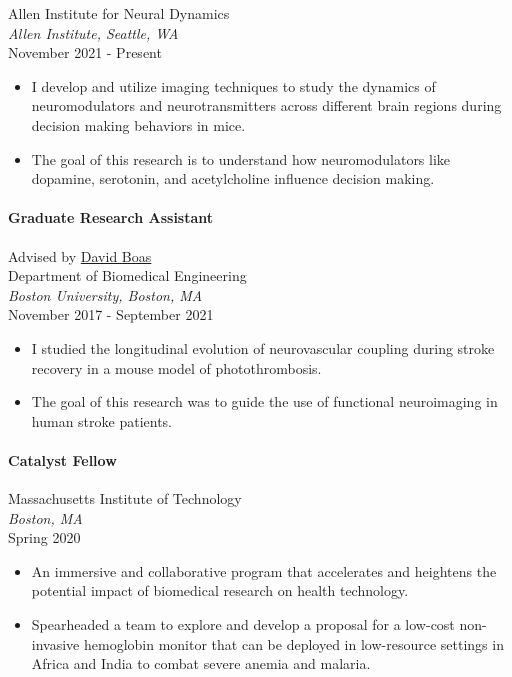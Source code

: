 \documentclass[
  letterpaper,
  DIV=11,
  numbers=noendperiod]{scrartcl}
\let\oldparagraph\paragraph
\renewcommand{\paragraph}[1]{\oldparagraph{#1}\mbox{}}
\providecommand{\tightlist}{%
  \setlength{\itemsep}{0pt}\setlength{\parskip}{0pt}}\usepackage{longtable,booktabs,array}
\begin{document}
Allen Institute for Neural Dynamics\\
\emph{Allen Institute, Seattle, WA}\\
November 2021 - Present

\begin{itemize}
\tightlist
\item
  I develop and utilize imaging techniques to study the dynamics of
  neuromodulators and neurotransmitters across different brain regions
  during decision making behaviors in mice.
\item
  The goal of this research is to understand how neuromodulators like
  dopamine, serotonin, and acetylcholine influence decision making.
\end{itemize}

\hypertarget{graduate-research-assistant}{%
\paragraph{Graduate Research
Assistant}\label{graduate-research-assistant}}

Advised by \href{https://sites.bu.edu/boas/}{David Boas}\\
Department of Biomedical Engineering\\
\emph{Boston University, Boston, MA}\\
November 2017 - September 2021

\begin{itemize}
\tightlist
\item
  I studied the longitudinal evolution of neurovascular coupling during
  stroke recovery in a mouse model of photothrombosis.
\item
  The goal of this research was to guide the use of functional
  neuroimaging in human stroke patients.
\end{itemize}

\hypertarget{catalyst-fellow}{%
\paragraph{Catalyst Fellow}\label{catalyst-fellow}}

Massachusetts Institute of Technology\\
\emph{Boston, MA}\\
Spring 2020

\begin{itemize}
\tightlist
\item
  An immersive and collaborative program that accelerates and heightens
  the potential impact of biomedical research on health technology.
\item
  Spearheaded a team to explore and develop a proposal for a low-cost
  non-invasive hemoglobin monitor that can be deployed in low-resource
  settings in Africa and India to combat severe anemia and malaria.
\end{itemize}
\end{document}
